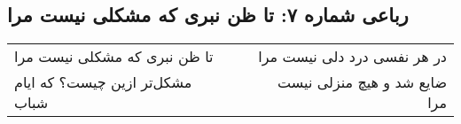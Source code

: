 \begin{center}
\section*{رباعی شماره ۷: تا ظن نبری که مشکلی نیست مرا}
\label{sec:007}
\begin{longtable}{l p{0.5cm} r}
تا ظن نبری که مشکلی نیست مرا
&&
در هر نفسی درد دلی نیست مرا
\\
مشکل‌تر ازین چیست؟ که ایام شباب
&&
ضایع شد و هیچ منزلی نیست مرا
\\
\end{longtable}
\end{center}
